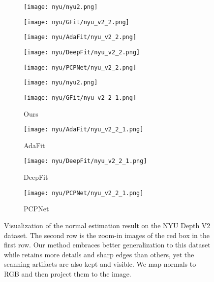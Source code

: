 \documentclass[runningheads]{llncs}
\begin{document}
\begin{figure}[t]
  \centering
  \begin{subfigure}{0.19\linewidth}
    \texttt{[image: nyu/nyu2.png]}
\end{subfigure}
  \begin{subfigure}{0.19\linewidth}
    \texttt{[image: nyu/GFit/nyu\_v2\_2.png]}
\end{subfigure}
  \begin{subfigure}{0.19\linewidth}
    \texttt{[image: nyu/AdaFit/nyu\_v2\_2.png]}
\end{subfigure}
  \begin{subfigure}{0.19\linewidth}
    \texttt{[image: nyu/DeepFit/nyu\_v2\_2.png]}
\end{subfigure}
  \begin{subfigure}{0.19\linewidth}
    \texttt{[image: nyu/PCPNet/nyu\_v2\_2.png]}
\end{subfigure}
    \begin{subfigure}{0.19\linewidth}
    \texttt{[image: nyu/nyu2.png]}
\end{subfigure}
  \begin{subfigure}{0.19\linewidth}
    \texttt{[image: nyu/GFit/nyu\_v2\_2\_1.png]}
    \caption{Ours}
  \end{subfigure}
  \begin{subfigure}{0.19\linewidth}
    \texttt{[image: nyu/AdaFit/nyu\_v2\_2\_1.png]}
    \caption{AdaFit}
  \end{subfigure}
  \begin{subfigure}{0.19\linewidth}
    \texttt{[image: nyu/DeepFit/nyu\_v2\_2\_1.png]}
    \caption{DeepFit}
  \end{subfigure}
  \begin{subfigure}{0.19\linewidth}
    \texttt{[image: nyu/PCPNet/nyu\_v2\_2\_1.png]}
    \caption{PCPNet}
  \end{subfigure}
  \caption{Visualization of the normal estimation result on the NYU Depth V2 dataset. The second row is the zoom-in images of the red box in the first row. Our method embraces better generalization to this dataset while retains more details and sharp edges than others, yet the scanning artifacts are also kept and visible. We map normals to RGB and then project them to the image.
}
  \label{fig:nyu}
\end{figure}
\end{document}
